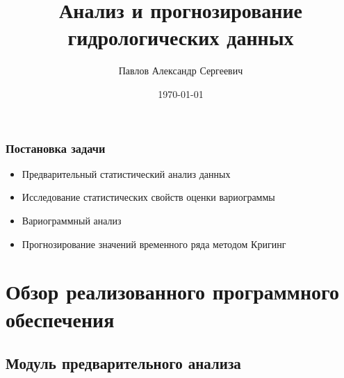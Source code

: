 \documentclass[10pt, ucs, pdf,aspectratio=169]{beamer}
\title[Анализ и прогнозирование гидрологических данных]{Анализ и прогнозирование гидрологических данных}    %
\author[Павлов Александр]{Павлов Александр Сергеевич}                 %
\date{\today}                    %
\begin{document}
\begin{frame}
  \titlepage
\end{frame}




\section{}

\begin{frame}
  \frametitle{Постановка задачи}   %

  \begin{itemize}
    \item Предварительный статистический анализ данных
    \item Исследование статистических свойств оценки вариограммы
    \item Вариограммный анализ
    \item Прогнозирование значений временного ряда методом Кригинг
  \end{itemize}
\end{frame}

\section{Обзор реализованного программного обеспечения}

\subsection{Модуль предварительного анализа}
\end{document}
